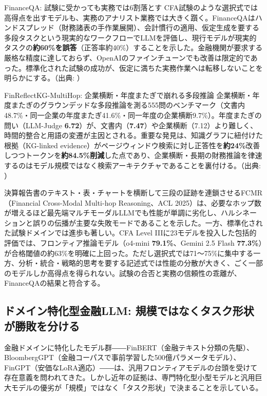 \begin{casestudy}{FinanceQA: 試験に受かっても実務では6割落とす}
CFA試験のような選択式では高得点を出すモデルも、実務のアナリスト業務では大きく躓く。FinanceQAはハンドスプレッド（財務諸表の手作業展開）、会計慣行の適用、仮定生成を要する多段タスクという現実的なワークフローでLLMを評価し、現行モデルが現実的タスクの\textbf{約60\%を誤答}（正答率約40\%）することを示した。金融機関が要求する厳格な精度に達しておらず、OpenAIのファインチューンでも改善は限定的であった。標準化された試験の成功が、仮定に満ちた実務作業へは転移しないことを明らかにする。（出典: \cite{x05financeqa2025}）
\end{casestudy}

\begin{casestudy}{FinReflectKG-MultiHop: 企業横断・年度またぎで崩れる多段推論}
企業横断・年度またぎのグラウンデッドな多段推論を測る555問のベンチマーク（文書内48.7\%・同一企業の年度またぎ41.6\%・同一年度の企業横断9.7\%）。年度またぎの問い（LLM-Judge \textbf{6.72}）が、文書内（\textbf{7.47}）や企業横断（7.12）より難しく、時間的整合と用語の変遷が主因とされる。重要な発見は、知識グラフに紐付けた根拠（KG-linked evidence）がページウィンドウ検索に対し正答性を\textbf{約24\%}改善しつつトークンを\textbf{約84.5\%削減}した点であり、企業横断・長期の財務推論を律速するのはモデル規模ではなく検索アーキテクチャであることを裏付ける。（出典: \cite{x05finreflectkg2025}）
\end{casestudy}

決算報告書のテキスト・表・チャートを横断して三段の証跡を連鎖させるFCMR（Financial Cross-Modal Multi-hop Reasoning、ACL 2025）は、必要なホップ数が増えるほど最先端マルチモーダルLLMでも性能が単調に劣化し、ハルシネーションと誤りの伝播が主要な失敗モードであることを示した\cite{x05fcmr2025}。一方、標準化された試験ドメインでは進歩も著しい。CFA Level IIIに23モデルを投入した包括的評価では、フロンティア推論モデル（o4-mini \textbf{79.1\%}、Gemini 2.5 Flash \textbf{77.3\%}）が合格閾値の約63\%を明確に上回った。ただし選択式では71〜75\%に集中する一方、分析・統合・戦略的思考を要する記述式では性能の分散が大きく、ごく一部のモデルしか高得点を得られない\cite{x05cfa3eval2025}。試験の合否と実務の信頼性の乖離が、FinanceQAの結果と符合する。

\subsection{ドメイン特化型金融LLM: 規模ではなくタスク形状が勝敗を分ける}

金融ドメインに特化したモデル群――FinBERT（金融テキスト分類の先駆）\cite{finbert2020}、BloombergGPT（金融コーパスで事前学習した500億パラメータモデル）\cite{bloomberggpt2023}、FinGPT（安価なLoRA適応）\cite{x05fingpt2023}――は、汎用フロンティアモデルの台頭を受けて存在意義を問われてきた。しかし近年の証拠は、専門特化型小型モデルと汎用巨大モデルの優劣が「規模」ではなく「タスク形状」で決まることを示している。

